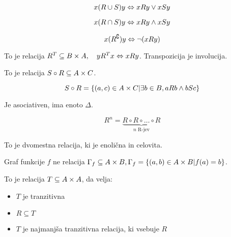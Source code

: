 \[
	x (R \cup S) y \Leftrightarrow x R y \lor x S y
\]

\[
	x (R \cap S)y \Leftrightarrow x R y \land x S y
\]

\[
	x (R^\complement)y \Leftrightarrow \lnot (x R y)
\]


To je relacija $R^T \subseteq B \times A,\quad y R^T x \Leftrightarrow x R y$. Transpozicija je involucija.


To je relacija $S \circ R \subseteq A \times C$.

\[
	S \circ R = \{(a, c) \in A\times C | \exists b \in B, aRb \land bSc\}
\]

Je asociativen, ima enoto $\Delta$.


\[
	R^n = \underbrace{R \circ R \circ \ldots \circ R}_{n \text{ R-jev}}
\]


To je dvomestna relacija, ki je enolična in celovita.

Graf funkcije $f$ ne relacija $\Gamma_f \subseteq A \times B, \Gamma_f = \{(a, b)  \in A \times B | f(a) = b\}$.


To je relacija $T \subseteq A\times A$, da velja:
\begin{itemize}
	\item $T$ je tranzitivna
	\item $R \subseteq T$
	\item $T$ je najmanjša tranzitivna relacija, ki vsebuje $R$
\end{itemize}